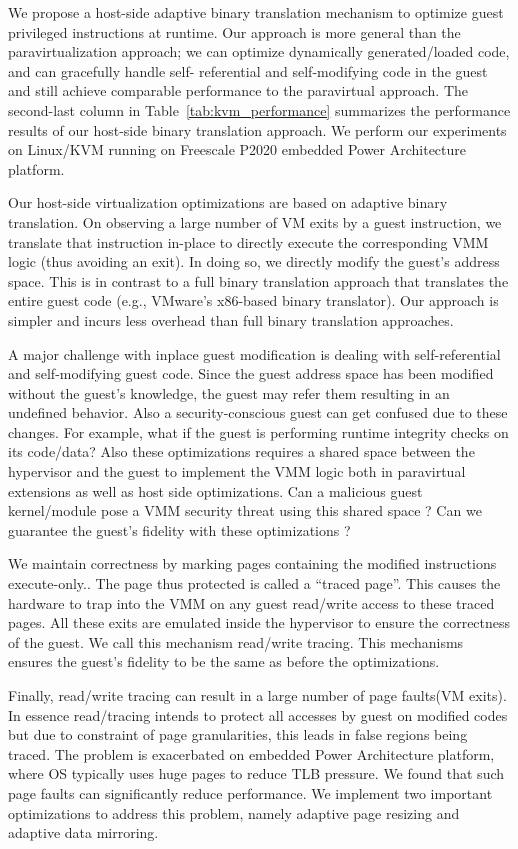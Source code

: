 We propose a host-side adaptive binary translation mechanism to optimize guest privileged instructions at runtime. Our approach is more general than the paravirtualization approach; we can optimize dynamically generated/loaded code, and can gracefully handle self- referential and self-modifying code in the guest and still achieve comparable performance to the paravirtual approach. The second-last column in Table~\ref{tab:kvm_performance} summarizes the performance results of our host-side binary translation approach. We perform our experiments on Linux/KVM running on Freescale P2020 embedded Power Architecture platform.

Our host-side virtualization optimizations are based on adaptive binary translation. On observing a large number of VM exits by a guest instruction, we translate that instruction in-place to directly execute the corresponding VMM logic (thus avoiding an exit). In doing so, we directly modify the guest’s address space. This is in contrast to a full binary translation approach that translates the entire guest code (e.g., VMware’s x86-based binary translator\cite{adams:asplos06}). Our approach is simpler and incurs less overhead than full binary translation approaches.

A major challenge with inplace guest modification is dealing with self-referential and self-modifying guest code. Since the guest address space has been modified without the guest's knowledge, the guest may refer them resulting in an undefined behavior. Also a security-conscious guest can get confused due to these changes. For example, what if the guest is performing runtime integrity checks on its code/data? Also these optimizations requires a shared space between the hypervisor and the guest to implement the VMM logic both in paravirtual extensions as well as host side optimizations. Can a malicious guest kernel/module pose a VMM security threat using this shared space ? Can we guarantee the guest's fidelity with these optimizations ?

We maintain correctness by marking pages containing the modified instructions execute-only.. The page thus protected is called a “traced page”. This causes the hardware to trap into the VMM on any guest read/write access to these traced pages. All these exits are emulated inside the hypervisor to ensure the correctness of the guest. We call this mechanism read/write tracing. This mechanisms ensures the guest's fidelity to be the same as before the optimizations.

Finally, read/write tracing can result in a large number of page faults(VM exits). In essence read/tracing intends to protect all accesses by guest on modified codes but due to constraint of page granularities, this leads in false regions being traced. The problem is exacerbated on embedded Power Architecture platform, where OS typically uses huge pages to reduce TLB pressure. We found that such page faults can significantly reduce performance. We implement two important optimizations to address this problem, namely adaptive page resizing and adaptive data mirroring.

